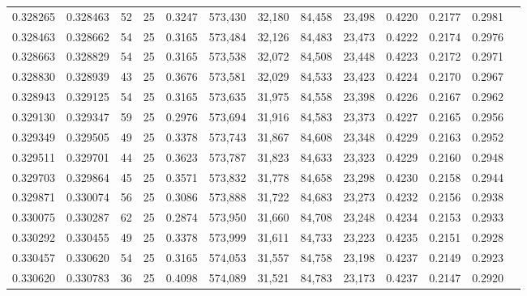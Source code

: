 \begin{tabular}{rrrrrrrrrrrrr}
0.328265 & 0.328463 &    52 &  25 &                                     0.3247 & 573,430 &  32,180 &  84,458 &  23,498 & 0.4220 & 0.2177 & 0.2981 \\
0.328463 & 0.328662 &    54 &  25 &                                     0.3165 & 573,484 &  32,126 &  84,483 &  23,473 & 0.4222 & 0.2174 & 0.2976 \\
0.328663 & 0.328829 &    54 &  25 &                                     0.3165 & 573,538 &  32,072 &  84,508 &  23,448 & 0.4223 & 0.2172 & 0.2971 \\
0.328830 & 0.328939 &    43 &  25 &                                     0.3676 & 573,581 &  32,029 &  84,533 &  23,423 & 0.4224 & 0.2170 & 0.2967 \\
0.328943 & 0.329125 &    54 &  25 &                                     0.3165 & 573,635 &  31,975 &  84,558 &  23,398 & 0.4226 & 0.2167 & 0.2962 \\
0.329130 & 0.329347 &    59 &  25 &                                     0.2976 & 573,694 &  31,916 &  84,583 &  23,373 & 0.4227 & 0.2165 & 0.2956 \\
0.329349 & 0.329505 &    49 &  25 &                                     0.3378 & 573,743 &  31,867 &  84,608 &  23,348 & 0.4229 & 0.2163 & 0.2952 \\
0.329511 & 0.329701 &    44 &  25 &                                     0.3623 & 573,787 &  31,823 &  84,633 &  23,323 & 0.4229 & 0.2160 & 0.2948 \\
0.329703 & 0.329864 &    45 &  25 &                                     0.3571 & 573,832 &  31,778 &  84,658 &  23,298 & 0.4230 & 0.2158 & 0.2944 \\
0.329871 & 0.330074 &    56 &  25 &                                     0.3086 & 573,888 &  31,722 &  84,683 &  23,273 & 0.4232 & 0.2156 & 0.2938 \\
0.330075 & 0.330287 &    62 &  25 &                                     0.2874 & 573,950 &  31,660 &  84,708 &  23,248 & 0.4234 & 0.2153 & 0.2933 \\
0.330292 & 0.330455 &    49 &  25 &                                     0.3378 & 573,999 &  31,611 &  84,733 &  23,223 & 0.4235 & 0.2151 & 0.2928 \\
0.330457 & 0.330620 &    54 &  25 &                                     0.3165 & 574,053 &  31,557 &  84,758 &  23,198 & 0.4237 & 0.2149 & 0.2923 \\
0.330620 & 0.330783 &    36 &  25 &                                     0.4098 & 574,089 &  31,521 &  84,783 &  23,173 & 0.4237 & 0.2147 & 0.2920 \\

\end{tabular}
